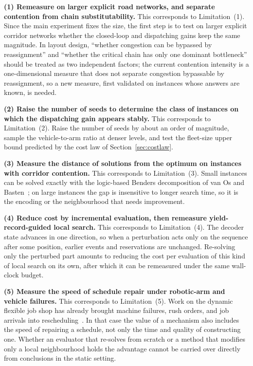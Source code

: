 \documentclass[manuscript,screen,review]{acmart}
\begin{document}
\textbf{(1) Remeasure on larger explicit road networks, and separate contention from chain substitutability.}
This corresponds to Limitation~(1). Since the main experiment fixes the size, the first step is to test on larger explicit corridor networks whether the closed-loop and dispatching gains keep the same magnitude. In layout design, ``whether congestion can be bypassed by reassignment'' and ``whether the critical chain has only one dominant bottleneck'' should be treated as two independent factors; the current contention intensity is a one-dimensional measure that does not separate congestion bypassable by reassignment, so a new measure, first validated on instances whose answers are known, is needed.

\textbf{(2) Raise the number of seeds to determine the class of instances on which the dispatching gain appears stably.}
This corresponds to Limitation~(2). Raise the number of seeds by about an order of magnitude, sample the vehicle-to-arm ratio at denser levels, and test the fleet-size upper bound predicted by the cost law of Section~\ref{sec:costlaw}.

\textbf{(3) Measure the distance of solutions from the optimum on instances with corridor contention.}
This corresponds to Limitation~(3). Small instances can be solved exactly with the logic-based Benders decomposition of van Os and Basten~\cite{vanos2026exact}; on large instances the gap is insensitive to longer search time, so it is the encoding or the neighbourhood that needs improvement.

\textbf{(4) Reduce cost by incremental evaluation, then remeasure yield-record-guided local search.}
This corresponds to Limitation~(4). The decoder state advances in one direction, so when a perturbation acts only on the sequence after some position, earlier events and reservations are unchanged. Re-solving only the perturbed part amounts to reducing the cost per evaluation of this kind of local search on its own, after which it can be remeasured under the same wall-clock budget.

\textbf{(5) Measure the speed of schedule repair under robotic-arm and vehicle failures.}
This corresponds to Limitation~(5). Work on the dynamic flexible job shop has already brought machine failures, rush orders, and job arrivals into rescheduling~\cite{gui2023dynamic,zhao2026deep,dauzereperes2024fjsp}.
In that case the value of a mechanism also includes the speed of repairing a schedule, not only the time and quality of constructing one. Whether an evaluator that re-solves from scratch or a method that modifies only a local neighbourhood holds the advantage cannot be carried over directly from conclusions in the static setting.
\end{document}
